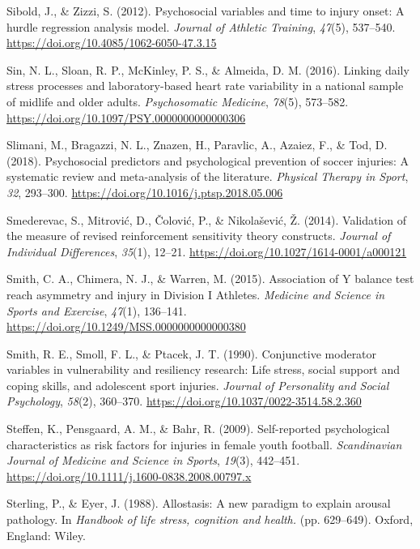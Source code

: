\documentclass[
  english,
  man,floatsintext]{apa6}
\begin{document}
\leavevmode\hypertarget{ref-Sibold2012}{}%
Sibold, J., \& Zizzi, S. (2012). Psychosocial variables and time to injury onset: A hurdle regression analysis model. \emph{Journal of Athletic Training}, \emph{47}(5), 537--540. \url{https://doi.org/10.4085/1062-6050-47.3.15}

\leavevmode\hypertarget{ref-Sin2016}{}%
Sin, N. L., Sloan, R. P., McKinley, P. S., \& Almeida, D. M. (2016). Linking daily stress processes and laboratory-based heart rate variability in a national sample of midlife and older adults. \emph{Psychosomatic Medicine}, \emph{78}(5), 573--582. \url{https://doi.org/10.1097/PSY.0000000000000306}

\leavevmode\hypertarget{ref-Slimani2018}{}%
Slimani, M., Bragazzi, N. L., Znazen, H., Paravlic, A., Azaiez, F., \& Tod, D. (2018). Psychosocial predictors and psychological prevention of soccer injuries: A systematic review and meta-analysis of the literature. \emph{Physical Therapy in Sport}, \emph{32}, 293--300. \url{https://doi.org/10.1016/j.ptsp.2018.05.006}

\leavevmode\hypertarget{ref-Smederevac2014}{}%
Smederevac, S., Mitrović, D., Čolović, P., \& Nikolašević, Ž. (2014). Validation of the measure of revised reinforcement sensitivity theory constructs. \emph{Journal of Individual Differences}, \emph{35}(1), 12--21. \url{https://doi.org/10.1027/1614-0001/a000121}

\leavevmode\hypertarget{ref-Smith2015}{}%
Smith, C. A., Chimera, N. J., \& Warren, M. (2015). Association of Y balance test reach asymmetry and injury in Division I Athletes. \emph{Medicine and Science in Sports and Exercise}, \emph{47}(1), 136--141. \url{https://doi.org/10.1249/MSS.0000000000000380}

\leavevmode\hypertarget{ref-Smith1990}{}%
Smith, R. E., Smoll, F. L., \& Ptacek, J. T. (1990). Conjunctive moderator variables in vulnerability and resiliency research: Life stress, social support and coping skills, and adolescent sport injuries. \emph{Journal of Personality and Social Psychology}, \emph{58}(2), 360--370. \url{https://doi.org/10.1037/0022-3514.58.2.360}

\leavevmode\hypertarget{ref-Steffen2009}{}%
Steffen, K., Pensgaard, A. M., \& Bahr, R. (2009). Self-reported psychological characteristics as risk factors for injuries in female youth football. \emph{Scandinavian Journal of Medicine and Science in Sports}, \emph{19}(3), 442--451. \url{https://doi.org/10.1111/j.1600-0838.2008.00797.x}

\leavevmode\hypertarget{ref-Sterling1988}{}%
Sterling, P., \& Eyer, J. (1988). Allostasis: A new paradigm to explain arousal pathology. In \emph{Handbook of life stress, cognition and health.} (pp. 629--649). Oxford, England: Wiley.
\end{document}
